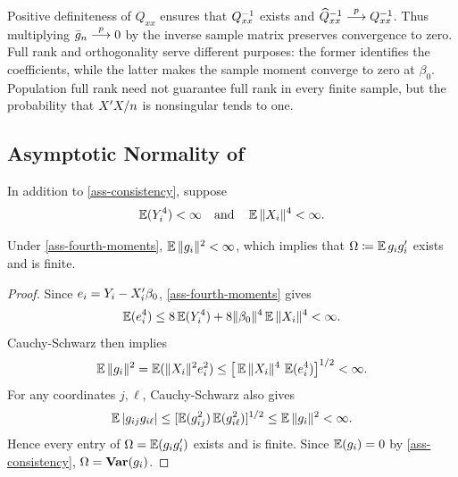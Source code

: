 \documentclass[a4paper,12pt]{article}
\begin{document}
\begin{remark}
	Positive definiteness of $Q_{xx}$ ensures that $Q_{xx}^{-1}$ exists and
	$\widehat Q_{xx}^{-1}\overset{p}{\longrightarrow} Q_{xx}^{-1}$.
	Thus multiplying $\bar g_n\overset{p}{\longrightarrow}0$ by the inverse sample matrix preserves convergence to zero.
	Full rank and orthogonality serve different purposes: the former identifies the coefficients,
	while the latter makes the sample moment converge to zero at $\beta_0$.
	Population full rank need not guarantee full rank in every finite sample,
	but the probability that $X^{\prime} X/n$ is nonsingular tends to one.
\end{remark}

\subsection{Asymptotic Normality of }

\begin{assumption}\label{ass-fourth-moments}
	In addition to \autoref{ass-consistency}, suppose
	\begin{align*}
		\operatorname{\mathbb{E}}(Y_i^4)<\infty
		\quad\text{and}\quad
		\operatorname{\mathbb{E}}\|X_i\|^4<\infty.
	\end{align*}
\end{assumption}

\begin{lemma}\label{lem-second-moment}
	Under \autoref{ass-fourth-moments}, $\operatorname{\mathbb{E}}\|g_i\|^2<\infty$,
	which implies that $\Omega\coloneqq\operatorname{\mathbb{E}} g_i g_i^{\prime}$ exists and is finite.
\end{lemma}
\begin{proof}
	Since $e_i=Y_i-X_i^{\prime}\beta_0$, \autoref{ass-fourth-moments} gives
	\begin{align*}
		\operatorname{\mathbb{E}}(e_i^4)\le8\operatorname{\mathbb{E}}(Y_i^4)+8\|\beta_0\|^4\operatorname{\mathbb{E}}\|X_i\|^4<\infty.
	\end{align*}
	Cauchy-Schwarz then implies
	\begin{align*}
		\operatorname{\mathbb{E}}\|g_i\|^2
		=\operatorname{\mathbb{E}}(\|X_i\|^2e_i^2)
		\le\big[\operatorname{\mathbb{E}}\|X_i\|^4\,\operatorname{\mathbb{E}}(e_i^4)\big]^{1/2}<\infty.
	\end{align*}
	For any coordinates $j,\ell$, Cauchy-Schwarz also gives
	\begin{align*}
		\operatorname{\mathbb{E}}|g_{ij}g_{i\ell}|
		\le[\operatorname{\mathbb{E}}(g_{ij}^2)\operatorname{\mathbb{E}}(g_{i\ell}^2)]^{1/2}
		\le\operatorname{\mathbb{E}}\|g_i\|^2<\infty.
	\end{align*}
	Hence every entry of $\Omega=\operatorname{\mathbb{E}}(g_ig_i^{\prime})$ exists and is finite.
	Since $\operatorname{\mathbb{E}}(g_i)=0$ by \autoref{ass-consistency}, $\Omega=\operatorname{\text{\textrm{\upshape\textbf{Var}}}}(g_i)$.
\end{proof}
\end{document}
